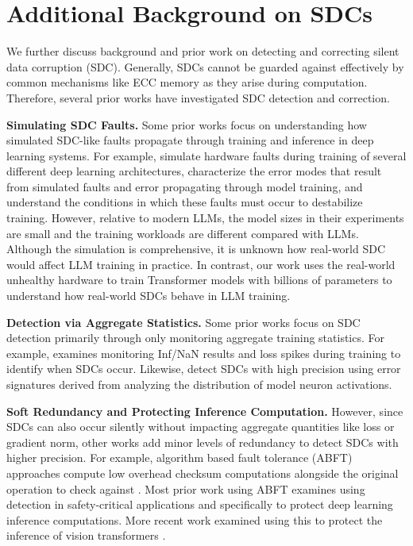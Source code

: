 

\section{Additional Background on SDCs}
\label{appendix:sdc_related_work}

We further discuss background and prior work on detecting and correcting silent data corruption (SDC). Generally, SDCs cannot be guarded against effectively by common mechanisms like ECC memory \cite{assetintertechSilentData} as they arise during computation. Therefore, several prior works have investigated SDC detection and correction.

\textbf{Simulating SDC Faults.} 
Some prior works focus on understanding how simulated SDC-like faults propagate through training and inference in deep learning systems. For example, \citet{heunderstandingandmitigatinghardwarefailures2023} simulate hardware faults during training of several different deep learning architectures, characterize the error modes that result from simulated faults and error propagating through model training, and understand the conditions in which these faults must occur to destabilize training. However, relative to modern LLMs, the model sizes in their experiments are small and the training workloads are different compared with LLMs. Although the simulation is comprehensive, it is unknown how real-world SDC would affect LLM training in practice. In contrast, our work uses the real-world unhealthy hardware to train Transformer models with billions of parameters to understand how real-world SDCs behave in LLM training.

\textbf{Detection via Aggregate Statistics.} Some prior works focus on SDC detection primarily through only monitoring aggregate training statistics. For example, \citet{hepermanenthardwarefailures} examines monitoring Inf/NaN results and loss spikes during training to identify when SDCs occur. Likewise, \citet{madrdna2024} detect SDCs with high precision using error signatures derived from analyzing the distribution of model neuron activations.

\textbf{Soft Redundancy and Protecting Inference Computation.} However, since SDCs can also occur silently without impacting aggregate quantities like loss or gradient norm, other works add minor levels of redundancy to detect SDCs with higher precision. For example, algorithm based fault tolerance (ABFT) approaches compute low overhead checksum computations alongside the original operation to check against \cite{wupanruosdcresilientabftmatmul, zhaiftblas}.
Most prior work using ABFT examines using detection in safety-critical applications \cite{Kosaian_2021} and specifically to protect deep learning inference computations\cite{Zhao_2021}. More recent work examined using this to protect the inference of vision transformers \cite{xue2023approxabftapproximatealgorithmbasedfault}.


